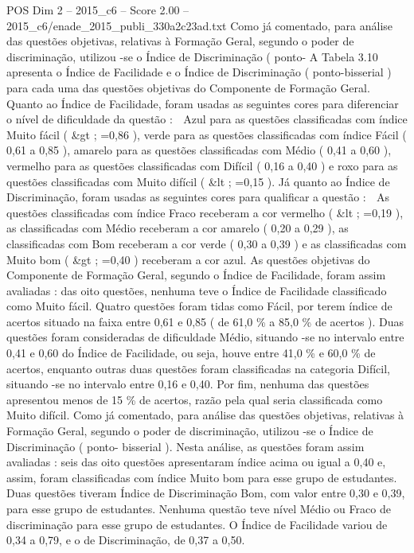 \begin{textsample}{POS Dim 2 – 2015\_c6 – Score 2.00 – 2015\_c6/enade\_2015\_publi\_330a2c23ad.txt}
Como já comentado, para análise das questões objetivas, relativas à Formação Geral, segundo o poder de discriminação, utilizou -se o Índice de Discriminação ( ponto- A Tabela 3.10 apresenta o Índice de Facilidade e o Índice de Discriminação ( ponto-bisserial ) para cada uma das questões objetivas do Componente de Formação Geral.
Quanto ao Índice de Facilidade, foram usadas as seguintes cores para diferenciar o nível de dificuldade da questão :  Azul para as questões classificadas com índice Muito fácil ( \&gt ; =0,86 ), verde para as questões classificadas com índice Fácil ( 0,61 a 0,85 ), amarelo para as questões classificadas com Médio ( 0,41 a 0,60 ), vermelho para as questões classificadas com Difícil ( 0,16 a 0,40 ) e roxo para as questões classificadas com Muito difícil ( \&lt ; =0,15 ).
Já quanto ao Índice de Discriminação, foram usadas as seguintes cores para qualificar a questão :  As questões classificadas com índice Fraco receberam a cor vermelho ( \&lt ; =0,19 ), as classificadas com Médio receberam a cor amarelo ( 0,20 a 0,29 ), as classificadas com Bom receberam a cor verde ( 0,30 a 0,39 ) e as classificadas com Muito bom ( \&gt ; =0,40 ) receberam a cor azul.
As questões objetivas do Componente de Formação Geral, segundo o Índice de Facilidade, foram assim avaliadas : das oito questões, nenhuma teve o Índice de Facilidade classificado como Muito fácil.
Quatro questões foram tidas como Fácil, por terem índice de acertos situado na faixa entre 0,61 e 0,85 ( de 61,0 \% a 85,0 \% de acertos ).
Duas questões foram consideradas de dificuldade Médio, situando -se no intervalo entre 0,41 e 0,60 do Índice de Facilidade, ou seja, houve entre 41,0 \% e 60,0 \% de acertos, enquanto outras duas questões foram classificadas na categoria Difícil, situando -se no intervalo entre 0,16 e 0,40.
Por fim, nenhuma das questões apresentou menos de 15 \% de acertos, razão pela qual seria classificada como Muito difícil.
Como já comentado, para análise das questões objetivas, relativas à Formação Geral, segundo o poder de discriminação, utilizou -se o Índice de Discriminação ( ponto- bisserial ).
Nesta análise, as questões foram assim avaliadas : seis das oito questões apresentaram índice acima ou igual a 0,40 e, assim, foram classificadas com índice Muito bom para esse grupo de estudantes.
Duas questões tiveram Índice de Discriminação Bom, com valor entre 0,30 e 0,39, para esse grupo de estudantes.
Nenhuma questão teve nível Médio ou Fraco de discriminação para esse grupo de estudantes.
O Índice de Facilidade variou de 0,34 a 0,79, e o de Discriminação, de 0,37 a 0,50.

\end{textsample}
